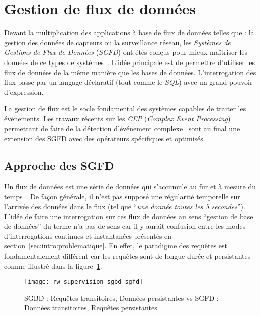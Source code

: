 \section{Gestion de flux de données}\label{sec:rw:supervision:datastream}
Devant la multiplication des applications à base de flux de données telles que : la gestion des données de capteurs ou la surveillance réseau, les \textit{Systèmes de Gestions de Flux de Données} (\textit{SGFD}) ont étés conçus pour mieux maîtriser les données de ce types de systèmes~\cite{Madden:tag, Yao:cougar, Cranor:gigascope}. L'idée principale est de permettre d'utiliser les flux de données de la même manière que les bases de données. L'interrogation des flux passe par un langage déclaratif (tout comme le \textit{SQL}) avec un grand pouvoir d'expression.

La gestion de flux est le socle fondamental des systèmes capables de traiter les événements. Les travaux récents sur les \textit{CEP} (\textit{Complex Event Processing}) permettant de faire de la détection d'événement complexe~\cite{Brenna:cayuga} sont au final une extension des SGFD avec des opérateurs spécifiques et optimisés.
\subsection{Approche des SGFD}
Un flux de données est une série de données qui s'accumule au fur et à mesure du temps~\cite{Golab:issues}. De façon générale, il n'est pas supposé une régularité temporelle sur l'arrivée des données dans le flux (tel que \enquote{\it une donnée toutes les 5 secondes}). L'idée de faire une interrogation sur ces flux de données au sens \enquote{gestion de base de données} du terme n'a pas de sens car il y aurait confusion entre les modes d'interrogations continues et instantanées présentés en section~\ref{sec:intro:problematique}. En effet, le paradigme des requêtes est fondamentalement différent car les requêtes sont de longue durée et persistantes~\cite{Chen:niagaracq} comme illustré dans la figure~\ref{fig:rw:supervision:sgbd-sgfd}.
\begin{figure}[ht]
    \centering
    \texttt{[image: rw-supervision-sgbd-sgfd]}
    \caption{SGBD : Requêtes transitoires, Données persistantes vs SGFD : Données transitoires, Requêtes persistantes~\protect\cite{Gurgen:sstreamware}}\label{fig:rw:supervision:sgbd-sgfd}
\end{figure}

